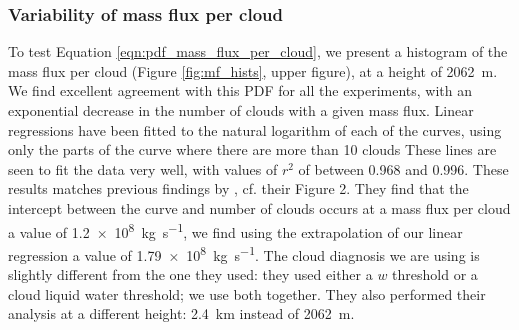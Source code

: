 \documentclass[11pt,a4paper]{article}
\begin{document}
%
\subsubsection{Variability of mass flux per cloud}
To test Equation \ref{eqn:pdf_mass_flux_per_cloud}, we present a histogram of the mass flux per cloud (Figure \ref{fig:mf_hists}, upper figure), at a height of \SI{2062}{m}. We find excellent agreement with this PDF for all the experiments, with an exponential decrease in the number of clouds with a given mass flux. Linear regressions have been fitted to the natural logarithm of each of the curves, using only the parts of the curve where there are more than 10 clouds These lines are seen to fit the data very well, with values of $r^2$ of between \SI{0.968}{} and \SI{0.996}{}. These results matches previous findings by \cite{CC2006II}, cf. their Figure 2. They find that the intercept between the curve and number of clouds occurs at a mass flux per cloud a value of \SI{1.2e8}{kg.s^{-1}}, we find using the extrapolation of our linear regression a value of \SI{1.79e8}{kg.s^{-1}}. The cloud diagnosis we are using is slightly different from the one they used: they used either a $w$ threshold or a cloud liquid water threshold; we use both together. They also performed their analysis at a different height: \SI{2.4}{km} instead of \SI{2062}{m}. 
\end{document}
